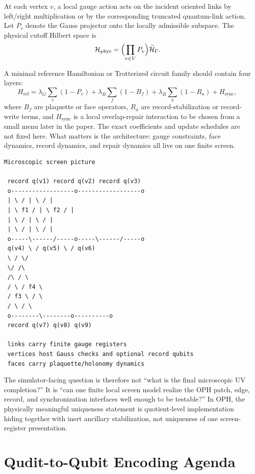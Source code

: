 \documentclass[11pt]{article}
\begin{document}
At each vertex $v$, a local gauge action acts on the incident oriented links by left/right
multiplication or by the corresponding truncated quantum-link action. Let $P_v$ denote the
Gauss projector onto the locally admissible subspace. The physical cutoff Hilbert space is
\begin{equation}
\mathcal H_{\mathrm{phys}} = \Bigl(\prod_{v\in V}P_v\Bigr)\widetilde{\mathcal H}_{\Gamma}.
\end{equation}

A minimal reference Hamiltonian or Trotterized circuit family should contain four layers:
\begin{equation}
H_{\mathrm{ref}} =
\lambda_G\sum_{v}(1-P_v)
+\lambda_B\sum_{f}(1-B_f)
+\lambda_R\sum_{a}(1-R_a)
+H_{\mathrm{sync}},
\end{equation}
where $B_f$ are plaquette or face operators, $R_a$ are record-stabilization or record-write
terms, and $H_{\mathrm{sync}}$ is a local overlap-repair interaction to be chosen from a small
menu later in the paper. The exact coefficients and update schedules are not fixed here.
What matters is the architecture: gauge constraints, face dynamics, record dynamics, and
repair dynamics all live on one finite screen.

\begin{verbatim}
Microscopic screen picture

 record q(v1) record q(v2) record q(v3)
 o------------------o------------------o
 | \ / | \ / |
 | \ f1 / | \ f2 / |
 | \ / | \ / |
 | \ / | \ / |
 o-----\------/-----o-----\------/-----o
 q(v4) \ / q(v5) \ / q(v6)
 \ / \/
 \/ /\
 /\ / \
 / \ / f4 \
 / f3 \ / \
 / \ / \
 o--------\--------o----------o
 record q(v7) q(v8) q(v9)

 links carry finite gauge registers
 vertices host Gauss checks and optional record qubits
 faces carry plaquette/holonomy dynamics
\end{verbatim}

The simulator-facing question is therefore not ``what is the final microscopic UV completion?'' It is
``can one finite local screen model realize the OPH patch, edge, record, and synchronization
interfaces well enough to be testable?'' In OPH, the physically meaningful
uniqueness statement is quotient-level implementation hiding together with inert ancillary
stabilization, not uniqueness of one screen-register presentation.

\section{Qudit-to-Qubit Encoding Agenda}
\end{document}
